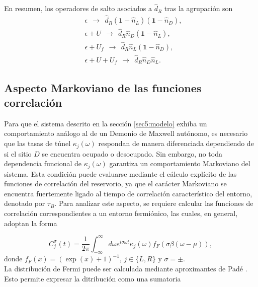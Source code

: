 \begin{appendixs}
En resumen, los operadores de salto asociados a \(\hat{d}_{R}\) tras la agrupación son
\begin{align*}
&\epsilon \ \ \to\ \ \hat{d}_{R}(\mathbf{1}-\hat{n}_{L})(\mathbf{1}-\hat{n}_{D}),\\
&\epsilon+U \ \ \to\ \ \hat{d}_{R}\hat{n}_{D}(\mathbf{1}-\hat{n}_{L}),\\
&\epsilon+U_{f} \ \ \to\ \ \hat{d}_{R}\hat{n}_{L}(\mathbf{1}-\hat{n}_{D}),\\
&\epsilon+U+U_{f} \ \ \to\ \ \hat{d}_{R}\hat{n}_{D}\hat{n}_{L}.
\end{align*}




\subsection{Aspecto Markoviano de las funciones correlación}
Para que el sistema descrito en la sección \ref{sec5:modelo} exhiba un comportamiento análogo al de un Demonio de Maxwell autónomo, es necesario que las tasas de túnel $\kappa_{j}(\omega)$ respondan de manera diferenciada dependiendo de si el sitio $D$ se encuentra ocupado o desocupado. Sin embargo, no toda dependencia funcional de $\kappa_{j}(\omega)$ garantiza un comportamiento Markoviano del sistema. Esta condición puede evaluarse mediante el cálculo explícito de las funciones de correlación del reservorio, ya que el carácter Markoviano se encuentra fuertemente ligado al tiempo de correlación característico del entorno, denotado por $\tau_{B}$. Para analizar este aspecto, se requiere calcular las funciones de correlación correspondientes a un entorno fermiónico, las cuales, en general, adoptan la forma

\begin{equation*}
    C^{\sigma}_{j}(t) = \frac{1}{2\pi} \int_{-\infty}^{\infty} d\omega e^{i\sigma \omega t} \kappa_{j}(\omega) f_{F}(\sigma \beta(\omega-\mu)),
\end{equation*}
donde $f_{F}(x) = (\exp(x)+1)^{-1}$, \(j\in\{L,R\}\) y $\sigma = \pm$. 
\\

La distribución de Fermi puede ser calculada mediante aproximantes de Padé \cite{hu2011pade,schinabeck2019hierarchical}. Esto permite expresar la ditribución como una sumatoria 


\end{appendixs}
